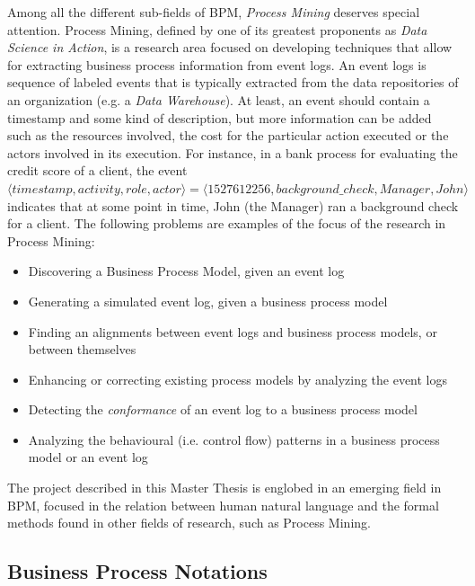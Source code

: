Among all the different sub-fields of BPM, \emph{Process Mining} deserves
special attention. Process Mining, defined by one of its greatest proponents as
\emph{Data Science in Action}\cite{van2016process}, is a research area focused on
developing techniques that allow for extracting business process information
from event logs. An event logs is sequence of labeled events that is typically
extracted from the data repositories of an organization (e.g. a \textit{Data
  Warehouse}). At least, an event should contain a timestamp and some kind of
description, but more information can be added such as the resources involved,
the cost for the particular action executed or the actors involved in its
execution. For instance, in a bank process for evaluating the credit score of a
client, the event $\langle timestamp, activity, role, actor \rangle = \langle
1527612256, background\_check, Manager, John \rangle$
indicates that at some point in time, John (the Manager) ran a background check
for a client. The following problems are examples of the focus of the research
in Process Mining:

\begin{itemize}
\item Discovering a Business Process Model, given an event log
\item Generating a simulated event log, given a business process model
\item Finding an alignments between event logs and business process models, or
  between themselves
\item Enhancing or correcting existing process models by analyzing the event logs
\item Detecting the \emph{conformance} of an event log to a business process model
\item Analyzing the behavioural (i.e. control flow) patterns in a business
  process model or an event log
\end{itemize}

The project described in this Master Thesis is englobed in an emerging
field\cite{some papers here} in BPM, focused in the relation between human
natural language and the formal methods found in other fields of research, such as
Process Mining.

\subsection{Business Process Notations}


